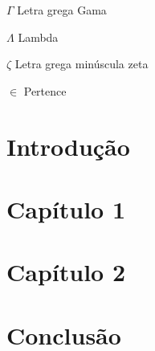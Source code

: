 \documentclass[
	12pt,				%
	openright,			%
	twoside,			%
	a4paper,			%
	english,			%
	french,				%
	spanish,			%
	brazil				%
	]{abntex2}
\begin{document}
\begin{simbolos}
  \item[$ \Gamma $] Letra grega Gama
  \item[$ \Lambda $] Lambda
  \item[$ \zeta $] Letra grega minúscula zeta
  \item[$ \in $] Pertence
\end{simbolos}

\tableofcontents*
\cleardoublepage



\textual

% 
\chapter*[Introdução]{Introdução}



% 
\chapter{Capítulo 1}


% 
\chapter{Capítulo 2}



\chapter*[Conclusão]{Conclusão}


\end{document}
